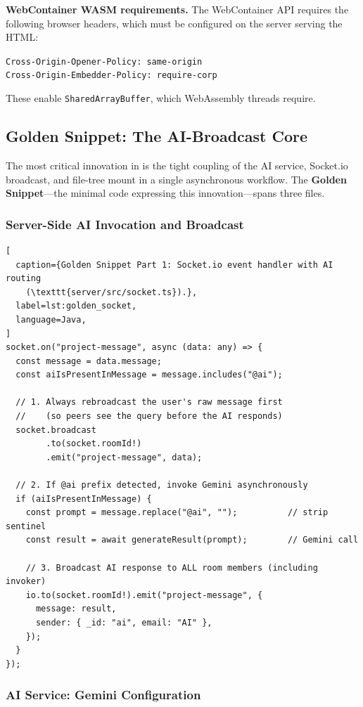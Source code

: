 \textbf{WebContainer WASM requirements.} The WebContainer API requires the
following browser headers, which must be configured on the server serving the
HTML:
\begin{center}
\texttt{Cross-Origin-Opener-Policy: same-origin}\\
\texttt{Cross-Origin-Embedder-Policy: require-corp}
\end{center}
These enable \texttt{SharedArrayBuffer}, which WebAssembly threads require.

\subsection{Golden Snippet: The AI-Broadcast Core}

The most critical innovation in \echoray{} is the tight coupling of the
AI service, Socket.io broadcast, and file-tree mount in a single asynchronous
workflow. The \textbf{Golden Snippet}---the minimal code expressing this
innovation---spans three files.

\subsubsection{Server-Side AI Invocation and Broadcast}

\begin{lstlisting}[
  caption={Golden Snippet Part 1: Socket.io event handler with AI routing
    (\texttt{server/src/socket.ts}).},
  label=lst:golden_socket,
  language=Java,
]
socket.on("project-message", async (data: any) => {
  const message = data.message;
  const aiIsPresentInMessage = message.includes("@ai");

  // 1. Always rebroadcast the user's raw message first
  //    (so peers see the query before the AI responds)
  socket.broadcast
        .to(socket.roomId!)
        .emit("project-message", data);

  // 2. If @ai prefix detected, invoke Gemini asynchronously
  if (aiIsPresentInMessage) {
    const prompt = message.replace("@ai", "");          // strip sentinel
    const result = await generateResult(prompt);        // Gemini call

    // 3. Broadcast AI response to ALL room members (including invoker)
    io.to(socket.roomId!).emit("project-message", {
      message: result,
      sender: { _id: "ai", email: "AI" },
    });
  }
});
\end{lstlisting}

\subsubsection{AI Service: Gemini Configuration}

